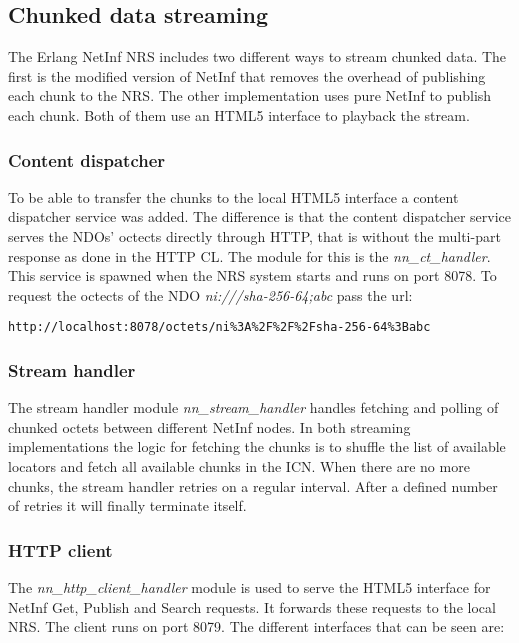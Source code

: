 \subsection{Chunked data streaming}

The Erlang NetInf NRS includes two different ways to stream chunked data. The first is the modified version of NetInf that removes the overhead of publishing each chunk to the NRS. The other implementation uses pure NetInf to publish each chunk. Both of them use an HTML5 interface to playback the stream. 


\subsubsection{Content dispatcher}

To be able to transfer the chunks to the local HTML5 interface a content dispatcher service was added. The difference is that the content dispatcher service serves the NDOs' octects directly through HTTP, that is without the multi-part response as done in the HTTP CL. The module for this is the \textit{nn\_ct\_handler}. This service is spawned when the NRS system starts and runs on port 8078. To request the octects of the NDO \textit{ni:///sha-256-64;abc} pass the url:
\begin{verbatim}
http://localhost:8078/octets/ni%3A%2F%2F%2Fsha-256-64%3Babc 
\end{verbatim}

\subsubsection{Stream handler}
The stream handler module \textit{nn\_stream\_handler} handles fetching and polling of chunked octets between different NetInf nodes.
In both streaming implementations the logic for fetching the chunks is to shuffle the list of available locators and fetch all available chunks in the ICN. When there are no more chunks, the stream handler retries on a regular interval. After a defined number of retries it will finally terminate itself.  

\subsubsection{HTTP client}
The \textit{nn\_http\_client\_handler} module is used to serve the HTML5 interface for NetInf Get, Publish and Search requests. It forwards these requests to the local NRS. The client runs on port 8079. The different interfaces that can be seen are:

